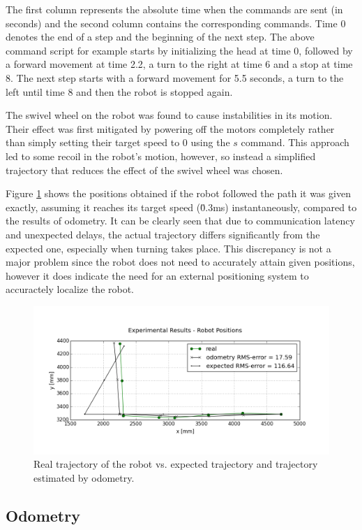 The first column represents the absolute time when the commands are sent (in seconds) and the second column contains the corresponding commands.
Time 0 denotes the end of a step and the beginning of the next step.
The above command script for example starts by initializing the head at time 0, followed by a forward movement at time 2.2, a turn to the right at time 6 and a stop at time 8.
The next step starts with a forward movement for 5.5 seconds, a turn to the left until time 8 and then the robot is stopped again.

The swivel wheel on the robot was found to cause instabilities in its motion. 
Their effect was first mitigated by powering off the motors completely rather than simply setting their target speed to 0 using the $s$ command. 
This approach led to some recoil in the robot's motion, however, so instead a simplified trajectory that reduces the effect of the swivel wheel was chosen. 

Figure \ref{fig:trajectory} shows the positions obtained if the robot followed the path it was given exactly, assuming it reaches its target speed (\u{0.3}{m\per s}) instantaneously, compared to the results of odometry. 
It can be clearly seen that due to communication latency and unexpected delays, the actual trajectory differs significantly from the expected one, especially when turning takes place. 
This discrepancy is not a major problem since the robot does not need to accurately attain given positions, however it does indicate the need for an external positioning system to accuractely localize the robot.

\begin{figure}
	\centering
	\includegraphics[width=0.8\linewidth]{files/trajectory.png} 
	\caption{Real trajectory of the robot vs. expected trajectory and trajectory estimated by odometry.}
	\label{fig:trajectory}
\end{figure}

\subsection{Odometry}

